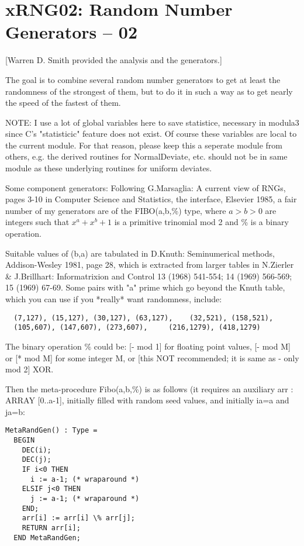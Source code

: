 \section{xRNG02: Random Number Generators -- 02}
[Warren D. Smith provided the analysis and the generators.]

The goal is to combine several random number generators to get at least the 
randomness of the strongest of them, but to do it in such a way as
to get nearly the speed of the fastest of them.

NOTE: I use a lot of global variables here to save statistice,
necessary in modula3 since C's "statisticic" feature does not exist.
Of course these variables are local to the current module.
For that reason, please keep this a seperate module from others,
e.g. the derived routines for NormalDeviate, etc. should not be in
same module as these underlying routines for uniform deviates.

Some component generators:
Following G.Marsaglia: A current view of RNGs, pages 3-10 in
Computer Science and Statistics, the interface, Elsevier 1985,
a fair number of my generators are of the FIBO(a,b,\%) type, where
$a>b>0$ are integers such that $x^a+x^b+1$ is a primitive trinomial
mod 2 and \% is a binary operation.

Suitable values of (b,a) are tabulated in D.Knuth: Seminumerical methods,
Addison-Wesley 1981, page 28, which is extracted from larger tables in
N.Zierler \& J.Brillhart: Informatrixion and Control 13 (1968) 541-554;
14 (1969) 566-569; 15 (1969) 67-69. Some pairs with "a" prime which
go beyond the Knuth table, which you can use if you *really*
want randomness, include: 
\begin{verbatim}
  (7,127), (15,127), (30,127), (63,127),    (32,521), (158,521), 
  (105,607), (147,607), (273,607),     (216,1279), (418,1279)
\end{verbatim}

The binary operation \% could be: [- mod 1] for floating point values,
[- mod M] or [* mod M] for some integer M,
or [this NOT recommended; it is same as - only mod 2] XOR.

Then the meta-procedure Fibo(a,b,\%) is as follows (it
requires an auxiliary arr : ARRAY [0..a-1], initially filled with
random seed values, and initially ia=a and ja=b:

\begin{verbatim}
MetaRandGen() : Type =
  BEGIN
    DEC(i);
    DEC(j);
    IF i<0 THEN
      i := a-1; (* wraparound *)
    ELSIF j<0 THEN
      j := a-1; (* wraparound *)
    END;
    arr[i] := arr[i] \% arr[j];
    RETURN arr[i];
  END MetaRandGen;
\end{verbatim}

